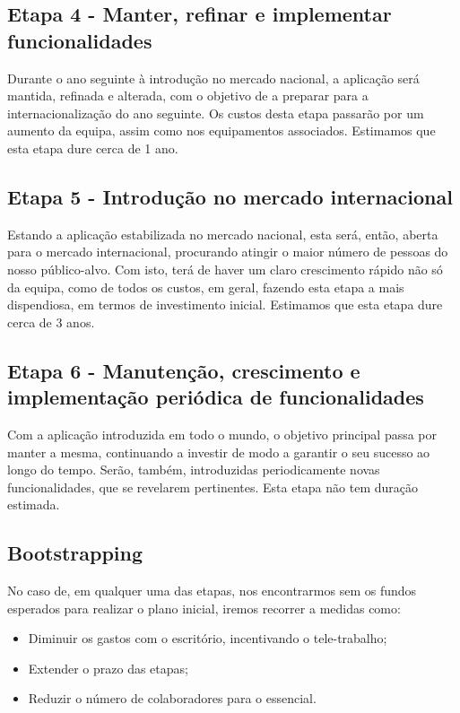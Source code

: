 \documentclass[11pt]{article}
\begin{document}
	\large
	\subsection{Etapa 4 - Manter, refinar e implementar funcionalidades}
	\normalsize
	
	Durante o ano seguinte à introdução no mercado nacional, a aplicação será mantida, refinada e alterada, com o objetivo de a preparar para a internacionalização do ano seguinte. Os custos desta etapa passarão por um aumento da equipa, assim como nos equipamentos associados. Estimamos que esta etapa dure cerca de 1 ano.
	
	\large
	\subsection{Etapa 5 - Introdução no mercado internacional}
	\normalsize
	
	Estando a aplicação estabilizada no mercado nacional, esta será, então, aberta para o mercado internacional, procurando atingir o maior número de pessoas do nosso público-alvo. Com isto, terá de haver um claro crescimento rápido não só da equipa, como de todos os custos, em geral, fazendo esta etapa a mais dispendiosa, em termos de investimento inicial. Estimamos que esta etapa dure cerca de 3 anos.
	
	\pagebreak
	
	\large
	\subsection{Etapa 6 - Manutenção, crescimento e implementação periódica de funcionalidades}
	\normalsize
	
	Com a aplicação introduzida em todo o mundo, o objetivo principal passa por manter a mesma, continuando a investir de modo a garantir o seu sucesso ao longo do tempo. Serão, também, introduzidas periodicamente novas funcionalidades, que se revelarem pertinentes. Esta etapa não tem duração estimada.
	
	\large
	\subsection{Bootstrapping}
	\normalsize
	
	No caso de, em qualquer uma das etapas, nos encontrarmos sem os fundos esperados para realizar o plano inicial, iremos recorrer a medidas como:
	
	\begin{itemize}
		\item Diminuir os gastos com o escritório, incentivando o tele-trabalho;
		\item Extender o prazo das etapas;
		\item Reduzir o número de colaboradores para o essencial.
	\end{itemize}
	
\end{document}
